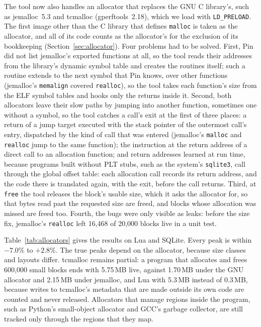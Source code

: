 \documentclass[11pt]{article}
\newcommand{\secref}[1]{Section~\ref{#1}}
\newcommand{\tabref}[1]{Table~\ref{#1}}
\begin{document}
The tool now also handles an allocator that replaces the GNU C library's, such as jemalloc~5.3 and tcmalloc (gperftools~2.18), which we load with \texttt{LD\_PRELOAD}. The first image other than the C library that defines \texttt{malloc} is taken as the allocator, and all of its code counts as the allocator's for the exclusion of its bookkeeping (\secref{sec:allocator}). Four problems had to be solved. First, Pin did not list jemalloc's exported functions at all, so the tool reads their addresses from the library's dynamic symbol table and creates the routines itself; such a routine extends to the next symbol that Pin knows, over other functions (jemalloc's \texttt{memalign} covered \texttt{realloc}), so the tool takes each function's size from the ELF symbol tables and hooks only the returns inside it. Second, both allocators leave their slow paths by jumping into another function, sometimes one without a symbol, so the tool catches a call's exit at the first of three places: a return of a jump target executed with the stack pointer of the outermost call's entry, dispatched by the kind of call that was entered (jemalloc's \texttt{malloc} and \texttt{realloc} jump to the same function); the instruction at the return address of a direct call to an allocation function; and return addresses learned at run time, because programs built without PLT stubs, such as the system's \texttt{sqlite3}, call through the global offset table: each allocation call records its return address, and the code there is translated again, with the exit, before the call returns. Third, at \texttt{free} the tool releases the block's usable size, which it asks the allocator for, so that bytes read past the requested size are freed, and blocks whose allocation was missed are freed too. Fourth, the bugs were only visible as leaks: before the size fix, jemalloc's \texttt{realloc} left 16{,}468 of 20{,}000 blocks live in a unit test.

\tabref{tab:allocators} gives the results on Lua and SQLite. Every peak is within $-7.0\%$ to $+2.8\%$. The true peaks depend on the allocator, because size classes and layouts differ. tcmalloc remains partial: a program that allocates and frees 600{,}000 small blocks ends with 5.75\,MB live, against 1.70\,MB under the GNU allocator and 2.15\,MB under jemalloc, and Lua with 5.3\,MB instead of 0.3\,MB, because writes to tcmalloc's metadata that are made outside its own code are counted and never released. Allocators that manage regions inside the program, such as Python's small-object allocator and GCC's garbage collector, are still tracked only through the regions that they map.
\end{document}
